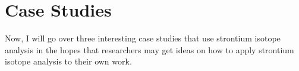 \documentclass[a4paper, 12pt]{article}
\begin{document}





\section{Case Studies}
Now, I will go over three interesting case studies that use strontium isotope analysis in the
hopes that researchers may get ideas on how to apply strontium isotope analysis to
their own work.
\end{document}
